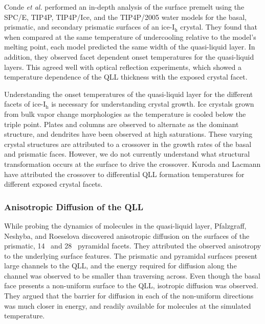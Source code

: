 Conde \textit{et al.} performed an in-depth analysis of the surface
premelt using the SPC/E, TIP4P, TIP4P/Ice, and the TIP4P/2005 water
models for the basal, prismatic, and secondary prismatic surfaces of
an ice-I$_\mathrm{h}$ crystal.\cite{Conde2008} They found that when
compared at the same temperature of undercooling relative to the
model's melting point, each model predicted the same width of the
quasi-liquid layer. In addition, they observed facet dependent onset
temperatures for the quasi-liquid layers. This agreed well with 
optical reflection experiments, which showed a temperature
dependence of the QLL thickness with the exposed
crystal facet.\cite{Elbaum1993} 

Understanding the onset temperatures of the quasi-liquid layer for the
different facets of ice-I$_\mathrm{h}$ is necessary for understanding
crystal growth.  Ice crystals grown from bulk vapor change
morphologies as the temperature is cooled below the triple
point. Plates and columns are observed to alternate as the dominant
structure, and dendrites have been observed at high
saturations.\cite{Libbrecht2005} These varying crystal structures are
attributed to a crossover in the growth rates of the basal and
prismatic faces. However, we do not currently understand what
structural transformation occurs at the surface to drive the
crossover.\cite{Libbrecht2005,Furukawa2007,Liu1995} Kuroda and Lacmann
have attributed the crossover to differential QLL formation
temperatures for different exposed crystal facets.\cite{Kuroda1982}



\subsubsection{Anisotropic Diffusion of the QLL}
While probing the dynamics of molecules in the quasi-liquid layer,
Pfalzgraff, Neshyba, and Roeselova discovered anisotropic diffusion on
the surfaces of the prismatic, 14\degree~ and 28\degree~ pyramidal
facets.\cite{Pfalzgraff2011} They attributed the observed anisotropy
to the underlying surface features. The prismatic and pyramidal
surfaces present large channels to the QLL, and the energy
required for diffusion along the channel was observed to be smaller
than traversing across. Even though the basal face presents a
non-uniform surface to the QLL, isotropic diffusion was observed. They
argued that the barrier for diffusion in each of the non-uniform
directions was much closer in energy, and readily available for
molecules at the simulated temperature.

